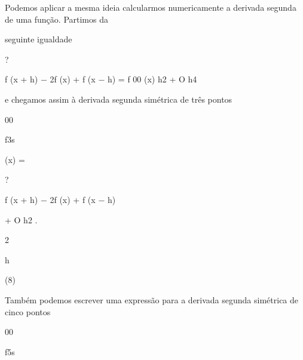 \documentclass[a4paper,portrait,12pt]{article}
\begin{document}
\begin{flushleft}
Podemos aplicar a mesma ideia calcularmos numericamente a derivada segunda de uma fun\c{c}\~{a}o. Partimos da
\end{flushleft}


\begin{flushleft}
seguinte igualdade
\end{flushleft}


?


\begin{flushleft}
f (x + h) $-$ 2f (x) + f (x $-$ h) = f 00 (x) h2 + O h4
\end{flushleft}


\begin{flushleft}
e chegamos assim \`{a} derivada segunda sim\'{e}trica de tr\^{e}s pontos
\end{flushleft}


00


\begin{flushleft}
f3s
\end{flushleft}


\begin{flushleft}
(x) =
\end{flushleft}





?


\begin{flushleft}
f (x + h) $-$ 2f (x) + f (x $-$ h)
\end{flushleft}


\begin{flushleft}
+ O h2 .
\end{flushleft}


2


\begin{flushleft}
h
\end{flushleft}





(8)





\begin{flushleft}
Tamb\'{e}m podemos escrever uma express\~{a}o para a derivada segunda sim\'{e}trica de cinco pontos
\end{flushleft}


00


\begin{flushleft}
f5s
\end{flushleft}
\end{document}
